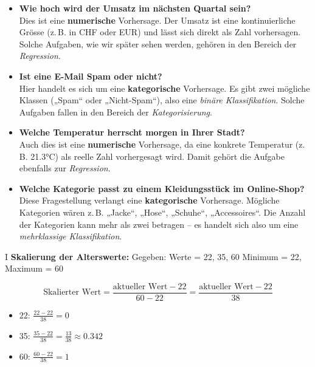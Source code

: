 \begin{aufgabe}{6}


\begin{itemize}
  \item \textbf{Wie hoch wird der Umsatz im nächsten Quartal sein?} \\
  Dies ist eine \textbf{numerische} Vorhersage. Der Umsatz ist eine kontinuierliche Grösse (z.\,B. in CHF oder EUR) und lässt sich direkt als Zahl vorhersagen. Solche Aufgaben, wie wir später sehen werden, gehören in den Bereich der \emph{Regression}.
  
  \item \textbf{Ist eine E-Mail Spam oder nicht?} \\
  Hier handelt es sich um eine \textbf{kategorische} Vorhersage. Es gibt zwei mögliche Klassen („Spam“ oder „Nicht-Spam“), also eine \emph{binäre Klassifikation}. Solche Aufgaben fallen in den Bereich der \emph{Kategorisierung}.
  
  \item \textbf{Welche Temperatur herrscht morgen in Ihrer Stadt?} \\
  Auch dies ist eine \textbf{numerische} Vorhersage, da eine konkrete Temperatur (z.\,B. 21.3°C) als reelle Zahl vorhergesagt wird. Damit gehört die Aufgabe ebenfalls zur \emph{Regression}.
  
  \item \textbf{Welche Kategorie passt zu einem Kleidungsstück im Online-Shop?} \\
  Diese Fragestellung verlangt eine \textbf{kategorische} Vorhersage. Mögliche Kategorien wären z.\,B. „Jacke“, „Hose“, „Schuhe“, „Accessoires“. Die Anzahl der Kategorien kann mehr als zwei betragen – es handelt sich also um eine \emph{mehrklassige Klassifikation}.
\end{itemize}
\end{aufgabe}


\begin{aufgabe}{I}
\textbf{Skalierung der Alterswerte:}  
Gegeben: Werte = 22, 35, 60  
Minimum = 22, Maximum = 60  

\[
\text{Skalierter Wert} = \frac{\text{aktueller Wert} - 22}{60 - 22} = \frac{\text{aktueller Wert} - 22}{38}
\]

\begin{itemize}
  \item 22: $\frac{22 - 22}{38} = 0$
  \item 35: $\frac{35 - 22}{38} = \frac{13}{38} \approx 0.342$
  \item 60: $\frac{60 - 22}{38} = 1$
\end{itemize}
\end{aufgabe}

